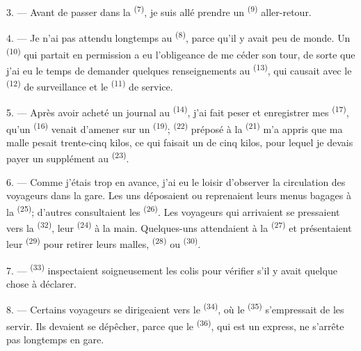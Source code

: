 3. --- Avant de passer dans la  \textsuperscript{(7)},
je suis allé prendre un  \textsuperscript{(9)} aller-retour.

4. --- Je n'ai pas attendu longtemps au  \textsuperscript{(8)},
parce qu'il y avait peu de monde. Un  \textsuperscript{(10)} qui
partait en permission a eu l'obligeance de me céder son tour, de sorte que j'ai
eu le temps de demander quelques renseignements au 
\textsuperscript{(13)}, qui causait avec le 
\textsuperscript{(12)} de surveillance et le 
\textsuperscript{(11)} de service.

\VUsaut{3.0mm}

5. --- Après avoir acheté un journal au 
\textsuperscript{(14)}, j'ai fait peser et enregistrer mes 
\textsuperscript{(17)}, qu'un  \textsuperscript{(16)} venait
d'amener sur un  \textsuperscript{(19)}; 
\textsuperscript{(22)} préposé à la  \textsuperscript{(21)} m'a
appris que ma malle pesait trente-cinq kilos, ce qui faisait un
 de cinq kilos, pour lequel je devais payer un supplément au
 \textsuperscript{(23)}.

6. --- Comme j'étais trop en avance, j'ai eu le loisir d'observer la circulation
des voyageurs dans la gare. Les uns déposaient ou reprenaient leurs menus
bagages à la  \textsuperscript{(25)}; d'autres consultaient les
 \textsuperscript{(26)}. Les voyageurs qui arrivaient
se pressaient vers la  \textsuperscript{(32)}, leur
 \textsuperscript{(24)} à la main. Quelques-uns attendaient à la
 \textsuperscript{(27)} et présentaient leur
 \textsuperscript{(29)} pour retirer leurs malles,
 \textsuperscript{(28)} ou 
\textsuperscript{(30)}.

7. ---  \textsuperscript{(33)} inspectaient
soigneusement les colis pour vérifier s'il y avait quelque chose à déclarer.

8. --- Certains voyageurs se dirigeaient vers le 
\textsuperscript{(34)}, où le  \textsuperscript{(35)}
s'empressait de les servir. Ils devaient se dépêcher, parce que le
 \textsuperscript{(36)}, qui est un express, ne s'arrête pas
longtemps en gare.

